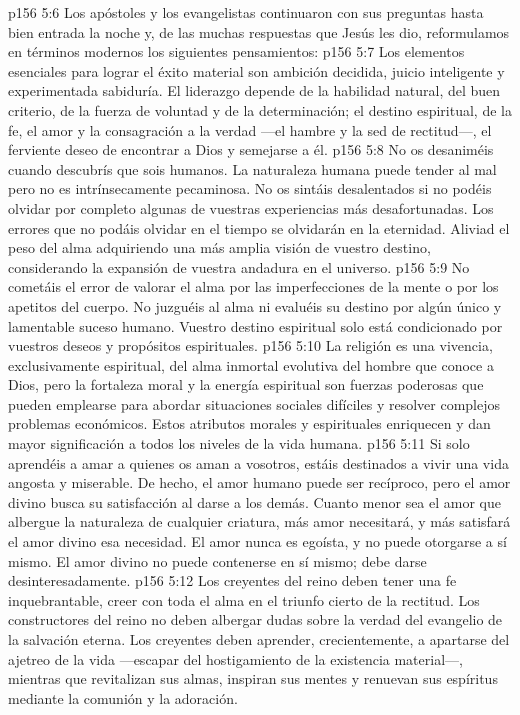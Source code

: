 \vs p156 5:6 Los apóstoles y los evangelistas continuaron con sus preguntas hasta bien entrada la noche y, de las muchas respuestas que Jesús les dio, reformulamos en términos modernos los siguientes pensamientos:
\vs p156 5:7 Los elementos esenciales para lograr el éxito material son ambición decidida, juicio inteligente y experimentada sabiduría. El liderazgo depende de la habilidad natural, del buen criterio, de la fuerza de voluntad y de la determinación; el destino espiritual, de la fe, el amor y la consagración a la verdad ---el hambre y la sed de rectitud---, el ferviente deseo de encontrar a Dios y semejarse a él.
\vs p156 5:8 No os desaniméis cuando descubrís que sois humanos. La naturaleza humana puede tender al mal pero no es intrínsecamente pecaminosa. No os sintáis desalentados si no podéis olvidar por completo algunas de vuestras experiencias más desafortunadas. Los errores que no podáis olvidar en el tiempo se olvidarán en la eternidad. Aliviad el peso del alma adquiriendo una más amplia visión de vuestro destino, considerando la expansión de vuestra andadura en el universo.
\vs p156 5:9 No cometáis el error de valorar el alma por las imperfecciones de la mente o por los apetitos del cuerpo. No juzguéis al alma ni evaluéis su destino por algún único y lamentable suceso humano. Vuestro destino espiritual solo está condicionado por vuestros deseos y propósitos espirituales.
\vs p156 5:10 La religión es una vivencia, exclusivamente espiritual, del alma inmortal evolutiva del hombre que conoce a Dios, pero la fortaleza moral y la energía espiritual son fuerzas poderosas que pueden emplearse para abordar situaciones sociales difíciles y resolver complejos problemas económicos. Estos atributos morales y espirituales enriquecen y dan mayor significación a todos los niveles de la vida humana.
\vs p156 5:11 Si solo aprendéis a amar a quienes os aman a vosotros, estáis destinados a vivir una vida angosta y miserable. De hecho, el amor humano puede ser recíproco, pero el amor divino busca su satisfacción al darse a los demás. Cuanto menor sea el amor que albergue la naturaleza de cualquier criatura, más amor necesitará, y más satisfará el amor divino esa necesidad. El amor nunca es egoísta, y no puede otorgarse a sí mismo. El amor divino no puede contenerse en sí mismo; debe darse desinteresadamente.
\vs p156 5:12 Los creyentes del reino deben tener una fe inquebrantable, creer con toda el alma en el triunfo cierto de la rectitud. Los constructores del reino no deben albergar dudas sobre la verdad del evangelio de la salvación eterna. Los creyentes deben aprender, crecientemente, a apartarse del ajetreo de la vida ---escapar del hostigamiento de la existencia material---, mientras que revitalizan sus almas, inspiran sus mentes y renuevan sus espíritus mediante la comunión y la adoración.
